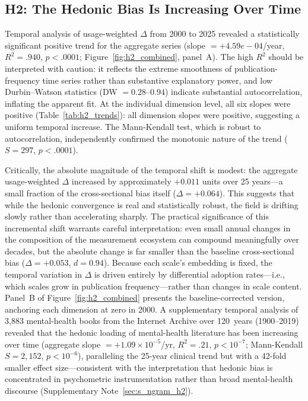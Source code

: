 \documentclass[12pt,a4paper]{article}
\begin{document}
\subsection{H2: The Hedonic Bias Is Increasing Over Time}\label{sec:results-h2}

Temporal analysis of usage-weighted $\Delta$ from 2000 to 2025 revealed a statistically significant positive trend for the aggregate series (slope $= +4.59e-04$/year, $R^2 = .940$, $p < .0001$; Figure~\ref{fig:h2_combined}, panel~A).
The high $R^2$ should be interpreted with caution: it reflects the extreme smoothness of publication-frequency time series rather than substantive explanatory power, and low Durbin--Watson statistics (DW $= 0.28$--$0.94$) indicate substantial autocorrelation, inflating the apparent fit.
At the individual dimension level, all six slopes were positive (Table~\ref{tab:h2_trends}): all dimension slopes were positive, suggesting a uniform temporal increase.
The Mann-Kendall test, which is robust to autocorrelation, independently confirmed the monotonic nature of the trend ($S = 297$, $p < .0001$).

Critically, the absolute magnitude of the temporal shift is modest: the aggregate usage-weighted $\Delta$ increased by approximately $+0.011$ units over 25 years---a small fraction of the cross-sectional bias itself ($\Delta = +0.064$).
This suggests that while the hedonic convergence is real and statistically robust, the field is drifting slowly rather than accelerating sharply.
The practical significance of this incremental shift warrants careful interpretation: even small annual changes in the composition of the measurement ecosystem can compound meaningfully over decades, but the absolute change is far smaller than the baseline cross-sectional bias ($\Delta = +0.053$, $d = 0.94$).
Because each scale's embedding is fixed, the temporal variation in $\Delta$ is driven entirely by differential adoption rates---i.e., which scales grow in publication frequency---rather than changes in scale content.
Panel~B of Figure~\ref{fig:h2_combined} presents the baseline-corrected version, anchoring each dimension at zero in 2000.
A supplementary temporal analysis of 3{,}883 mental-health books from the Internet Archive over 120~years (1900--2019) revealed that the hedonic loading of mental-health literature has been increasing over time (aggregate slope $= +1.09 \times 10^{-5}$/yr, $R^2 = .21$, $p < 10^{-7}$; Mann-Kendall $S = 2{,}152$, $p < 10^{-6}$), paralleling the 25-year clinical trend but with a 42-fold smaller effect size---consistent with the interpretation that hedonic bias is concentrated in psychometric instrumentation rather than broad mental-health discourse (Supplementary Note~\ref{sec:s_ngram_h2}).
\end{document}
